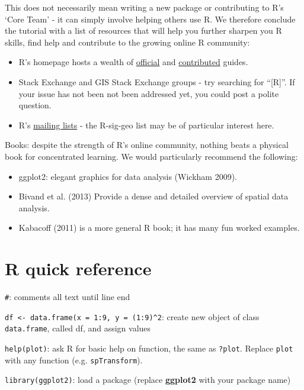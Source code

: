 \documentclass[]{article}
\begin{document}
This does not necessarily mean writing a new package or contributing to
R's `Core Team' - it can simply involve helping others use R. We
therefore conclude the tutorial with a list of resources that will help
you further sharpen you R skills, find help and contribute to the
growing online R community:

\begin{itemize}
\itemsep1pt\parskip0pt
\item
  R's homepage hosts a wealth of
  \href{http://cran.r-project.org/manuals.html}{official} and
  \href{http://cran.r-project.org/other-docs.html}{contributed} guides.
\item
  Stack Exchange and GIS Stack Exchange groups - try searching for
  ``{[}R{]}''. If your issue has not been not been addressed yet, you
  could post a polite question.
\item
  R's \href{http://www.r-project.org/mail.html}{mailing lists} - the
  R-sig-geo list may be of particular interest here.
\end{itemize}

Books: despite the strength of R's online community, nothing beats a
physical book for concentrated learning. We would particularly recommend
the following:

\begin{itemize}
\itemsep1pt\parskip0pt
\item
  ggplot2: elegant graphics for data analysis (Wickham 2009).
\item
  Bivand et al. (2013) Provide a dense and detailed overview of spatial
  data analysis.
\item
  Kabacoff (2011) is a more general R book; it has many fun worked
  examples.
\end{itemize}

\section{R quick reference}\label{r-quick-reference}

\texttt{\#}: comments all text until line end

\texttt{df \textless{}- data.frame(x = 1:9, y = (1:9)\^{}2}: create new
object of class \texttt{data.frame}, called df, and assign values

\texttt{help(plot)}: ask R for basic help on function, the same as
\texttt{?plot}. Replace \texttt{plot} with any function (e.g.
\texttt{spTransform}).

\texttt{library(ggplot2)}: load a package (replace \textbf{ggplot2} with
your package name)
\end{document}
